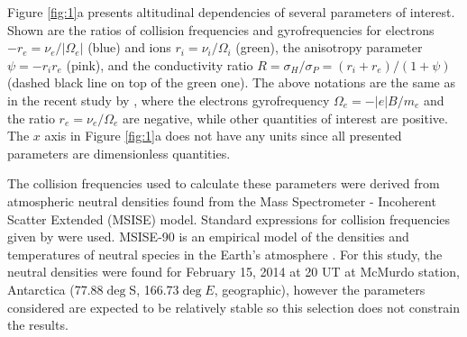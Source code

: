 Figure \ref{fig:1}a presents altitudinal dependencies of several parameters of interest. Shown are the ratios of collision frequencies and gyrofrequencies for electrons \(-r_e=\nu_e/|\Omega_e|\) (blue) and ions \(r_i=\nu_i/\Omega_i\) (green), the anisotropy parameter \(\psi=-r_i r_e\) (pink), and the conductivity ratio \(R=\sigma_H/\sigma_P = \left(r_i+r_e\right)/\left(1+\psi\right)\) (dashed black line on top of the green one). The above notations are the same as in the recent study by \citet{Makarevich2014c}, where the electrons gyrofrequency \(\Omega_e=-|e|B/m_e\) and the ratio \(r_e=\nu_e/\Omega_e\) are negative, while other quantities of interest are positive. The \(x\) axis in Figure \ref{fig:1}a does not have any units since all presented parameters are dimensionless quantities.

The collision frequencies used to calculate these parameters were derived from atmospheric neutral densities found from the Mass Spectrometer - Incoherent Scatter Extended (MSISE) model.  Standard expressions for collision frequencies given by \citet{Schunk1978} were used. MSISE-90 is an empirical model of the densities and temperatures of neutral species in the Earth's atmosphere \citep{Hedin1991}.  For this study, the neutral densities were found for February 15, 2014 at 20 UT at McMurdo station, Antarctica (77.88\(\deg\)S, 166.73\(\deg\)\(E\), geographic), however the parameters considered are expected to be relatively stable so this selection does not constrain the results.   

